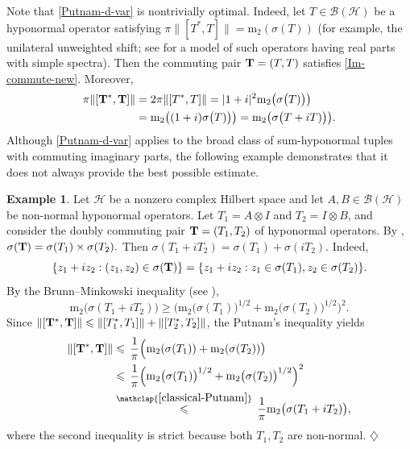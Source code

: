 \documentclass[10pt, a4paper, oneside, reqno]{amsproc}
\numberwithin{equation}{section}
\theoremstyle{remark}
\theoremstyle{definition}
\newtheorem{example}[theorem]{Example}
\newcommand*{\Ge}{\geqslant}
\newcommand*{\Le}{\leqslant}
\begin{document}
Note that \eqref{Putnam-d-var} is 
nontrivially optimal. Indeed, let $T \in \mathcal B(\mathcal H)$ be a hyponormal operator satisfying $\pi\|[T^*, T]\|=\mathrm{m}_2(\sigma(T))$ (for example, the unilateral unweighted shift; see \cite[Theorem~5]{P1972} for a model of such operators having real parts with simple spectra). Then the commuting pair ${\bf T}=(T, T)$ satisfies \eqref{Im-commute-new}. Moreover,
\begin{align} \notag
\pi\|[{\bf T}^*, {\bf T}]\| &= 2\pi \|[T^*, T]\|
=|1+i|^2\mathrm{m}_2\big(\sigma\big(T)\big)\big) \\ \label{optimal}
&=\mathrm{m}_2\big((1+i)\sigma\big(T)\big)\big)=\mathrm{m}_2\big(\sigma\big(T+iT)\big)\big).
\end{align}   
Although \eqref{Putnam-d-var} applies to the broad class of sum-hyponormal tuples with commuting imaginary parts, the following example demonstrates that it does not always provide the best possible estimate. 
\begin{example} Let $\mathcal H$ be a nonzero complex Hilbert space and let $A, B \in \mathcal B(\mathcal H)$ be non-normal hyponormal operators. Let $T_1 = A \otimes I$ and $T_2=I \otimes B$, and 
consider the doubly commuting pair ${\bf T}=(T_1, T_2)$ of hyponormal operators. By \cite[Theorem~2.2]{CV1978}, $\sigma({\bf T})=\sigma(T_1)\times \sigma(T_2).$
Then $\sigma(T_1+iT_2)=\sigma(T_1)+\sigma(iT_2)$. Indeed,
$$\{z_1+iz_2 : (z_1, z_2)\in \sigma({\bf T})\}=\{z_1+iz_2 : z_1 \in \sigma(T_1), z_2 \in \sigma(T_2)\}.$$
By the Brunn--Minkowski inequality (see \cite[ Theorem~12.2.2]{Ma2002}),
\begin{equation}
\label{classical-Putnam}
\mathrm{m}_2\big(\sigma(T_1+iT_2)\big)\Ge \Big(  \mathrm{m}_2\big(\sigma(T_1)\big)^{1/2}+\mathrm{m}_2\big(\sigma(T_2)\big)^{1/2}\Big)^{2}.
\end{equation}
Since $\|[{\bf T}^*, {\bf T}]\| \Le \|[T^*_1, T_1]\|+\|[T^*_2, T_2]\|$, the Putnam's inequality yields
\begin{align*}
\|[{\bf T}^*, {\bf T}]\| & \Le \, \frac{1}{\pi}\Big(\mathrm{m}_2(\sigma(T_1))+\mathrm{m}_2(\sigma(T_2))\big) \\
&\Le \, \frac{1}{\pi}\Big(\mathrm{m}_2\big(\sigma(T_1)\big)^{1/2}+\mathrm{m}_2\big(\sigma(T_2)\big)^{1/2}\Big)^{2}\\
&\stackrel{\mathclap{\eqref{classical-Putnam}}}{\Le}  \, \frac{1}{\pi}\mathrm{m}_2\big(\sigma(T_1+iT_2)\big),
\end{align*}
where the second inequality is strict because both $T_1, T_2$ are non-normal.
\hfill $\diamondsuit$
\end{example}
\end{document}
